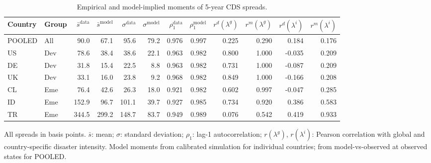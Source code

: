 \begin{table}[H]
\centering
\caption{Empirical and model-implied moments of 5-year CDS spreads.}
\label{tab:simulated_moments_5y}
\begin{tabular}{llrrrrrrrrrr}
\toprule
Country & Group & $\bar{s}^{\text{data}}$ & $\bar{s}^{\text{model}}$ & $\sigma^{\text{data}}$ & $\sigma^{\text{model}}$ & $\rho^{\text{data}}_1$ & $\rho^{\text{model}}_1$ & $r^d(\lambda^g)$ & $r^m(\lambda^g)$ & $r^d(\lambda^i)$ & $r^m(\lambda^i)$ \\
\midrule
POOLED & All & 90.0 & 67.1 & 95.6 & 79.2 & 0.976 & 0.997 & 0.225 & 0.290 & 0.184 & 0.176 \\
US & Dev & 78.6 & 38.4 & 38.6 & 22.1 & 0.963 & 0.982 & 0.800 & 1.000 & -0.035 & 0.209 \\
DE & Dev & 31.8 & 15.4 & 22.5 & 8.8 & 0.963 & 0.982 & 0.731 & 1.000 & -0.087 & 0.209 \\
UK & Dev & 33.1 & 16.0 & 23.8 & 9.2 & 0.968 & 0.982 & 0.849 & 1.000 & -0.166 & 0.208 \\
CL & Eme & 76.4 & 42.6 & 26.3 & 18.0 & 0.921 & 0.982 & 0.602 & 0.997 & -0.047 & 0.285 \\
ID & Eme & 152.9 & 96.7 & 101.1 & 39.7 & 0.927 & 0.985 & 0.734 & 0.920 & 0.386 & 0.583 \\
TR & Eme & 344.5 & 299.2 & 148.7 & 83.7 & 0.949 & 0.989 & 0.076 & 0.542 & 0.419 & 0.933 \\
\bottomrule
\end{tabular}
\begin{tablenotes}[flushleft]\footnotesize
\item All spreads in basis points. $\bar{s}$: mean; $\sigma$: standard deviation; $\rho_1$: lag-1 autocorrelation; $r(\lambda^g)$, $r(\lambda^i)$: Pearson correlation with global and country-specific disaster intensity. Model moments from calibrated simulation for individual countries; from model-vs-observed at observed states for POOLED.
\end{tablenotes}
\end{table}
